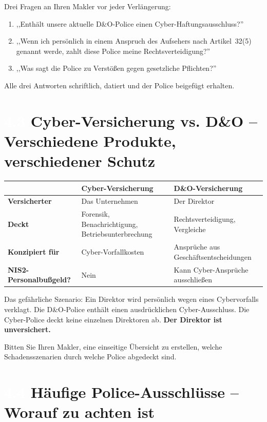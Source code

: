 \documentclass[11pt,a4paper,twoside]{book}
\newcommand{\lessontag}[1]{%
  \texorpdfstring{%
    \setlength{\fboxsep}{3pt}\colorbox{nisd2blue}{\textcolor{white}{\footnotesize\bfseries #1}}\quad%
  }{Lektion #1\ }%
}
\begin{document}
\begin{actionbox}
Drei Fragen an Ihren Makler vor jeder Verlängerung:
\begin{enumerate}
  \item ,,Enthält unsere aktuelle D\&O-Police einen Cyber-Haftungsausschluss?''
  \item ,,Wenn ich persönlich in einem Anspruch des Aufsehers nach Artikel~32(5) genannt werde, zahlt diese Police meine Rechtsverteidigung?''
  \item ,,Was sagt die Police zu Verstößen gegen gesetzliche Pflichten?''
\end{enumerate}
Alle drei Antworten schriftlich, datiert und der Police beigefügt erhalten.
\end{actionbox}

\section{\lessontag{4.3}Cyber-Versicherung vs. D\&O -- Verschiedene Produkte, verschiedener Schutz}

\begin{center}
\begin{tabular}{@{}lll@{}}
\toprule
\textbf{} & \textbf{Cyber-Versicherung} & \textbf{D\&O-Versicherung} \\
\midrule
\textbf{Versicherter} & Das Unternehmen & Der Direktor \\
\textbf{Deckt} & Forensik, Benachrichtigung, Betriebsunterbrechung & Rechtsverteidigung, Vergleiche \\
\textbf{Konzipiert für} & Cyber-Vorfallkosten & Ansprüche aus Geschäftsentscheidungen \\
\textbf{NIS2-Personalbußgeld?} & Nein & Kann Cyber-Ansprüche ausschließen \\
\bottomrule
\end{tabular}
\end{center}

Das gefährliche Szenario: Ein Direktor wird persönlich wegen eines Cybervorfalls verklagt. Die D\&O-Police enthält einen ausdrücklichen Cyber-Ausschluss. Die Cyber-Police deckt keine einzelnen Direktoren ab. \textbf{Der Direktor ist unversichert.}

Bitten Sie Ihren Makler, eine einseitige Übersicht zu erstellen, welche Schadensszenarien durch welche Police abgedeckt sind.

\section{\lessontag{4.4}Häufige Police-Ausschlüsse -- Worauf zu achten ist}
\end{document}

